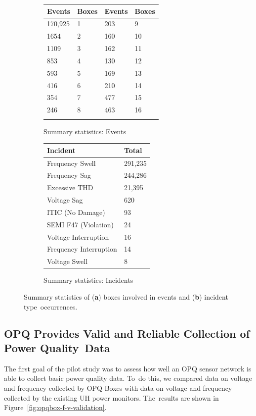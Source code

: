 \documentclass[energies,article,accept,moreauthors,pdftex]{Definitions/mdpi}
\begin{document}
\begin{figure}[H]
\centering
\begin{subfigure}{.5\textwidth}
\begin{tabularx}{\textwidth}{XXXX|}
\toprule
\textbf{Events} & \textbf{Boxes} & \textbf{Events} & \textbf{Boxes} \\
\midrule
170,925 & 1 & 203 & 9 \\
1654 & 2 & 160 & 10 \\
1109 & 3 & 162 & 11 \\
853 & 4 & 130 & 12 \\
593 & 5 & 169 & 13 \\
416 & 6 & 210 & 14 \\
354 & 7 & 477 & 15 \\
246 & 8 & 463 & 16 \\
& & & \\
\bottomrule
\end{tabularx}
\caption{Summary statistics: Events}
\end{subfigure}%
\begin{subfigure}{.5\textwidth}
\begin{tabularx}{\textwidth}{lX}
\toprule
\textbf{Incident} & \textbf{Total} \\
\midrule
Frequency Swell & 291,235 \\
Frequency Sag & 244,286 \\
Excessive THD & 21,395 \\
Voltage Sag & 620 \\
ITIC (No Damage) & 93 \\
SEMI F47 (Violation) & 24 \\
Voltage Interruption & 16 \\
Frequency Interruption & 14 \\
Voltage Swell & 8 \\
\bottomrule
\end{tabularx}
\caption{Summary statistics: Incidents}
\end{subfigure}
\caption{Summary statistics of (\textbf{a}) boxes involved in events and (\textbf{b}) incident type~occurrences.}
\label{fig:statistics}
\end{figure}
\unskip

\subsection{OPQ Provides Valid and Reliable Collection of Power Quality~Data}
\label{hyp:01}

The first goal of the pilot study was to assess how well an OPQ sensor network is able to collect basic power quality data. To~do this, we compared data on voltage and frequency collected by OPQ Boxes with data on voltage and frequency collected by the existing UH power monitors. The~results are shown in Figure~\ref{fig:opqbox-f-v-validation}.
\end{document}
